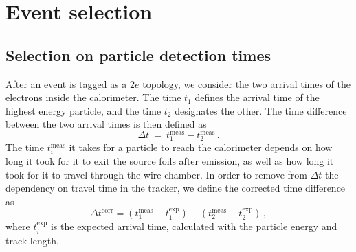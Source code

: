 \section{Event selection}

\subsection{Selection on particle detection times}

After an event is tagged as a $2e$ topology, we consider the two arrival times of the electrons inside the calorimeter.
The time $t_{1}$ defines the arrival time of the highest energy particle, and the time $t_{2}$ designates the other.
The time difference between the two arrival times is then defined as
\begin{equation}
\Delta t~=~t^{\text{meas}}_{1}-t^{\text{meas}}_{2}\,.
\end{equation}
The time $t_{i}^{\text{meas}}$ it takes for a particle to reach the calorimeter depends on how long it took for it to exit the source foils after emission, as well as how long it took for it to travel through the wire chamber.
In order to remove from $\Delta t$ the dependency on travel time in the tracker, we define the corrected time difference as
\begin{equation}
\Delta t^{\text{corr}} = (t^{\text{meas}}_{1} - t^{\text{exp}}_{1}) - (t^{\text{meas}}_{2} - t^{\text{exp}}_{2})\,,
\end{equation}
where $t^{\text{exp}}_{i}$ is the expected arrival time, calculated with the particle energy and track length.

